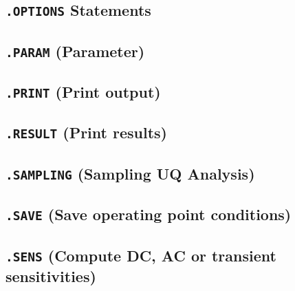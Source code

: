 \newpage
\subsection{\texttt{.OPTIONS} Statements}


\newpage
\subsection{\texttt{.PARAM} (Parameter)}





\newpage
\subsection{\texttt{.PRINT} (Print output)}\label{.PRINT}


\newpage
\subsection{\texttt{.RESULT} (Print results)}\label{.RESULT}


\newpage
\subsection{\texttt{.SAMPLING} (Sampling UQ Analysis)}\label{.SAMPLING}


\newpage
\subsection{\texttt{.SAVE} (Save operating point conditions)}


\newpage
\subsection{\texttt{.SENS} (Compute DC, AC or transient sensitivities)}
\label{SensitivityAnalysis}


